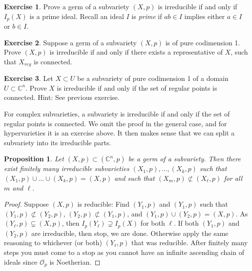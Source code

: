 \documentclass[12pt,openany]{book}
\newcommand{\C}{{\mathbb{C}}}
\newcommand{\sO}{{\mathscr{O}}}
\theoremstyle{plain}
\newtheorem{prop}[thm]{Proposition}
\theoremstyle{remark}
\theoremstyle{definition}
\newenvironment{exbox}{%
    \def\FrameCommand{\vrule width 1pt \relax\hspace{10pt}}%
    \MakeFramed{\advance\hsize-\width\FrameRestore}%
}{%
    \endMakeFramed
}
\theoremstyle{exercise}
\newtheorem{exercise}{Exercise}[section]
\theoremstyle{example}
\newcommand{\thmref}[1]{\hyperref[#1]{Theorem~\ref*{#1}}}
\begin{document}
\begin{exbox}
\begin{exercise}
Prove a germ of a subvariety $(X,p)$ is irreducible
if and only if $I_p(X)$ is a prime ideal.
Recall an ideal $I$ is \emph{prime}
if $ab \in I$ implies either $a \in I$ or $b
\in I$.
\end{exercise}

\begin{exercise}
Suppose a germ of a subvariety $(X,p)$ is of pure codimension 1.
Prove $(X,p)$ is irreducible if and only if there
exists a representative of $X$, such that $X_{\textit{reg}}$
is connected.  %
\end{exercise}

\begin{exercise}
Let $X \subset U$ be a subvariety of pure codimension 1 of a domain $U
\subset \C^n$.
Prove $X$ is irreducible if and only if the set of regular points
is connected.  Hint: See previous exercise.
\end{exercise}
\end{exbox}

For complex subvarieties, a subvariety is irreducible if
and only if the set of regular points is connected.  We omit the proof
in the general case, and for hypervarieties it is an exercise above.
It then makes sense that we can split a subvariety into its irreducible parts.

\begin{prop}
Let $(X,p) \subset (\C^n,p)$ be a germ of a subvariety.  Then there exist
finitely many irreducible subvarieties $(X_1,p),\ldots,(X_k,p)$ such that
$(X_1,p) \cup \ldots \cup (X_k,p) = (X,p)$ and such that $(X_m,p)
\not\subset (X_\ell,p)$ for all $m$ and $\ell$.
\end{prop}

\begin{proof}
Suppose $(X,p)$ is reducible:
Find $(Y_1,p)$ and $(Y_1,p)$ such that $(Y_1,p) \not\subset (Y_2,p)$,
$(Y_2,p) \not\subset (Y_1,p)$, and
$(Y_1,p) \cup (Y_2,p) = (X,p)$.
As $(Y_\ell,p) \subsetneq (X,p)$, then
$I_p(Y_\ell) \supsetneq I_p(X)$ for both $\ell$.  If both
$(Y_1,p)$ and $(Y_2,p)$ are irreducible, then stop, we are done.  Otherwise
apply the same reasoning to whichever (or both) $(Y_\ell,p)$ that was
reducible.  After finitely many steps you must come to a stop as you cannot
have an infinite ascending chain of ideals since $\sO_p$ is Noetherian.
\end{proof}
\end{document}

